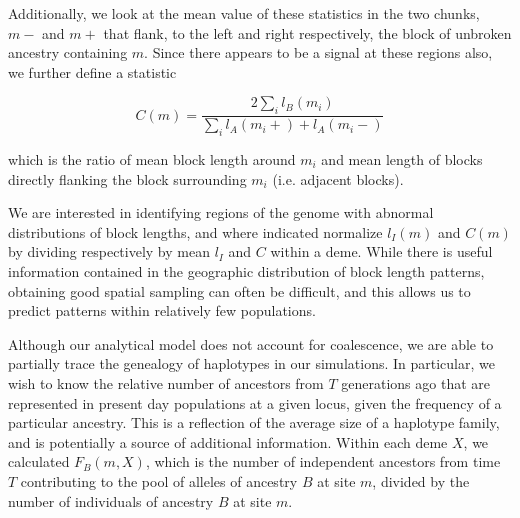\documentclass[11pt,letterpaper]{article}
\begin{document}
Additionally, we look at the mean value of these statistics in the two chunks, $m-$ and $m+$ that flank, to the left and right respectively, the block of unbroken ancestry containing $m$. Since there appears to be a signal at these regions also, we further define a statistic 

$$C(m) =  \frac{2\sum_i{l_B(m_i)}}{\sum_i{l_A(m_i+)+l_A(m_i-)}}$$

which is the ratio of mean block length around $m_i$ and mean length of blocks directly flanking the block surrounding $m_i$ (i.e. adjacent blocks).

We are interested in identifying regions of the genome with abnormal distributions of block lengths, and where indicated normalize $l_I(m)$ and $C(m)$ by dividing respectively by mean $l_I$ and $C$  within a deme. While there is useful information contained in the geographic distribution of block length patterns, obtaining good spatial sampling can often be difficult, and this allows us to predict patterns within relatively few populations. 





Although our analytical model does not account for coalescence, we are able to partially trace the genealogy of haplotypes in our simulations. In particular, we wish to know the relative number of ancestors from $T$ generations ago that are represented in present day populations at a given locus, given the frequency of a particular ancestry. This is a reflection of the average size of a haplotype family, and is potentially a source of additional information. Within each deme $X$, we calculated $F_B(m,X)$, which is the number of independent ancestors from time $T$ contributing to the pool of alleles of ancestry $B$ at site $m$, divided by the number of individuals of ancestry $B$ at site $m$.



\end{document}
